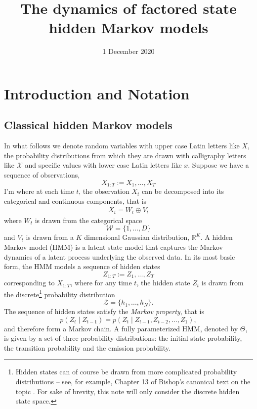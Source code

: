 \documentclass{amsart}
\title{The dynamics of factored state hidden Markov models}
\date{1 December 2020}
\begin{document}
\maketitle

\section{Introduction and Notation}\label{sec:intro}

\subsection{Classical hidden Markov models}
In what follows we denote random variables with upper case Latin letters like 
$X$, the probability distributions from which they are drawn with calligraphy 
letters like $\mathcal X$ and specific values with lower case Latin letters like $x$.  Suppose we have a sequence of observations, 
\[
X_{1:T} := X_1,...,X_T
	\]I'm 
where at each time $t$, the observation $X_t$ can be decomposed into its 
categorical and continuous components, that is 
\begin{eqnarray}\label{eqn:decomposition}
X_t = W_t\oplus V_t
\end{eqnarray}
where $W_{t}$ is drawn from the categorical space
\[ 
\mathcal W = \{1,...,D\}
\]
and $V_t$ is drawn from a $K$ dimensional Gaussian distribution, $\mathbb R^K$.
A hidden Markov model (HMM) is a latent state model that captures the Markov dynamics of a latent process underlying the observed data.  In its most basic form, the HMM models a sequence of hidden states
\[
Z_{1:T} := Z_1,...,Z_T
\]
corresponding to $X_{1:T}$, where for any time $t$, the hidden state $Z_t$ is 
drawn from the discrete\footnote{Hidden states can of course be drawn from more complicated probability 
distributions -- see, for example, Chapter 13 of Bishop's canonical text on the 
topic \cite{B06}.  For sake of brevity, this note will only 
consider the discrete hidden state space.} probability distribution
\[
\mathcal{Z} = \{h_1,...,h_N\}.
\]
The sequence of hidden states satisfy the {\em Markov property}, that is 
\[
p(Z_t\mid Z_{t-1})=p(Z_t\mid Z_{t-1},Z_{t-2},...,Z_1),
\]
and therefore form a Markov chain.  A fully parameterized HMM, denoted by 
$\Theta$, is given by a set of three probability distributions: the initial state probability, the transition probability and the 
emission probability.
\end{document}
